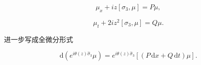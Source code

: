 \documentclass[
    lang=cn,
    scheme=chinese,
    mode=simple,
    device=normal,
    color=blue,
    math=cm,
    thmcnt=section,
    12pt
]{elegantbook}
\begin{document}
\begin{equation}
    \mu_x+iz[\sigma_3,\mu]=P\mu,
    \tag{5.1.7}
    \label{eq:5.1.7}
\end{equation}

\begin{equation}
    \mu_t+2iz^2[\sigma_3,\mu]=Q\mu.
    \tag{5.1.8}
    \label{eq:5.1.8}
\end{equation}

进一步写成全微分形式

\begin{equation}
    \mathrm d\!\left(e^{i\theta(z)\widehat{\sigma}_3}\mu\right)
    =
    e^{i\theta(z)\widehat{\sigma}_3}
    \left[(P\,\mathrm dx+Q\,\mathrm dt)\mu\right].
    \tag{5.1.9}
    \label{eq:5.1.9}
\end{equation}









\end{document}
